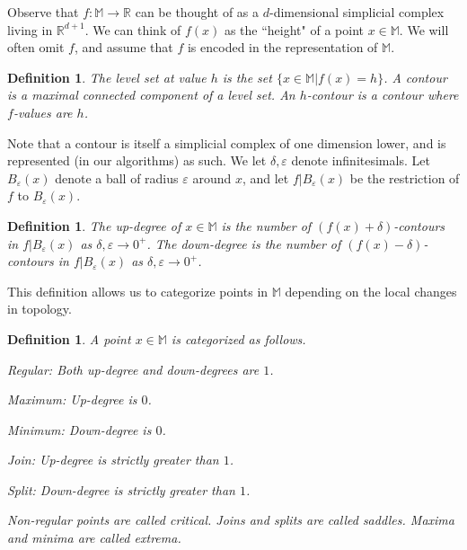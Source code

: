 \documentclass[11pt]{article}
\newtheorem{definition}[theorem]{Definition}
\theoremstyle{definition}
\newcommand{\MM}{\mathbb{M}}
\newcommand{\RR}{\mathbb{R}}
\newcommand{\eps}{\varepsilon}
\begin{document}
Observe that $f:\MM \rightarrow \RR$ can be thought of as a $d$-dimensional simplicial complex living in $\RR^{d+1}$.
We can think of $f(x)$ as the ``height" of a point $x \in \MM$.
We will often omit $f$, and assume that $f$ is encoded in the representation of $\MM$.

\begin{definition} \label{def:level} The level set at value $h$ is the set $\{x \in \MM| f(x) = h\}$.
A contour is a maximal connected component of a level set. An $h$-contour is a contour where $f$-values are $h$.
\end{definition}

Note that a contour is itself a simplicial complex of one dimension lower, and is represented (in our algorithms) as such.
We let $\delta, \eps$ denote infinitesimals. Let $B_\eps(x)$ denote a ball of radius $\eps$ around $x$, and let 
$f|B_\eps(x)$ be the restriction of $f$ to $B_\eps(x)$.


\begin{definition} \label{def:deg} The up-degree of $x \in \MM$ is the number of $(f(x) + \delta)$-contours in $f|B_\eps(x)$
as $\delta, \eps \rightarrow 0^+$. The down-degree is the number of $(f(x) - \delta)$-contours in $f|B_\eps(x)$
as $\delta, \eps \rightarrow 0^+$.
\end{definition}

This definition allows us to categorize points in $\MM$ depending on the local changes in topology.

\begin{definition} \label{def:points} A point $x \in \MM$ is categorized as follows.
\begin{asparaitem}
	\item Regular: Both up-degree and down-degrees are $1$.
	\item Maximum: Up-degree is $0$.
	\item Minimum: Down-degree is $0$.
	\item Join: Up-degree is strictly greater than $1$.
	\item Split: Down-degree is strictly greater than $1$.
\end{asparaitem}
Non-regular points are called \emph{critical}. Joins and splits are called \emph{saddles}.
Maxima and minima are called \emph{extrema}.
\end{definition}
\end{document}
